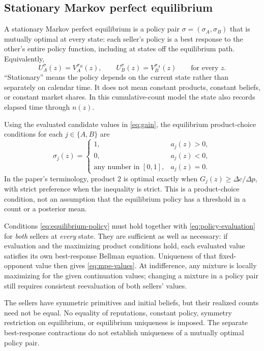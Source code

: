 \documentclass[11pt]{article}
\begin{document}
\subsection{Stationary Markov perfect equilibrium}

A stationary Markov perfect equilibrium is a policy pair
$\sigma=(\sigma_A,\sigma_B)$ that is mutually optimal at every state:
each seller's policy is a best response to the other's entire policy
function, including at states off the equilibrium path. Equivalently,
\begin{equation}\label{eq:mpe-values}
U_A^\sigma(z)=V_A^{\sigma_B}(z),\qquad
U_B^\sigma(z)=V_B^{\sigma_A}(z)\qquad\text{for every }z.
\end{equation}
``Stationary'' means the policy depends on the current state rather
than separately on calendar time. It does not mean constant products,
constant beliefs, or constant market shares. In this cumulative-count
model the state also records elapsed time through $n(z)$.

Using the evaluated candidate values in \eqref{eq:gain}, the equilibrium
product-choice conditions for each $j\in\{A,B\}$ are
\begin{equation}\label{eq:equilibrium-policy}
\sigma_j(z)=
\begin{cases}
1,&a_j(z)>0,\\
0,&a_j(z)<0,\\
\text{any number in }[0,1],&a_j(z)=0.
\end{cases}
\end{equation}
In the paper's terminology, product $2$ is optimal exactly when
$G_j(z)\geq\Delta c/\Delta p$, with strict preference when the
inequality is strict. This is a product-choice condition, not an
assumption that the equilibrium policy has a threshold in a count or
a posterior mean.

Conditions \eqref{eq:equilibrium-policy} must hold together with
\eqref{eq:policy-evaluation} for \emph{both} sellers at \emph{every}
state. They are sufficient as well as necessary: if evaluation and
the maximizing product conditions hold, each evaluated value satisfies
its own best-response Bellman equation. Uniqueness of that fixed-
opponent value then gives \eqref{eq:mpe-values}. At indifference,
any mixture is locally maximizing for the given continuation values;
changing a mixture in a policy pair still requires consistent
reevaluation of both sellers' values.

The sellers have symmetric primitives and initial beliefs, but their
realized counts need not be equal. No equality of reputations, constant
policy, symmetry restriction on equilibrium, or equilibrium uniqueness
is imposed. The separate best-response contractions do not establish
uniqueness of a mutually optimal policy pair.
\end{document}
